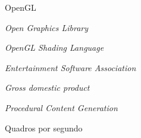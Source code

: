 \documentclass[tg]{mdtuffs}
\begin{document}

\listoffigures

\listoftables



\begin{listofabbrv}{OpenGL}
    \item [OpenGL] \textit{Open Graphics Library}
    \item [GLSL] \textit{OpenGL Shading Language}
    \item [ESA] \textit{Entertainment Software Association}
    \item [GDP] \textit{Gross domestic product}
    \item [PCG] \textit{Procedural Content Generation}
    \item [fps] Quadros por segundo
    
\end{listofabbrv}
\end{document}

